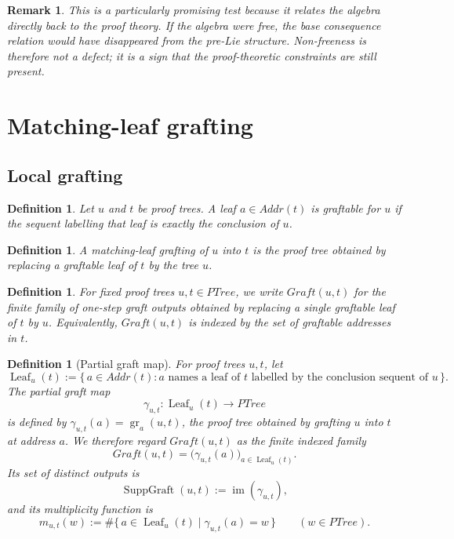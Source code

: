 \documentclass[11pt]{article}
\newtheorem{definition}[theorem]{Definition}
\newtheorem{remark}[theorem]{Remark}
\newcommand{\PTree}{\mathit{PTree}}
\newcommand{\Addr}{\mathit{Addr}}
\newcommand{\Graft}{\mathit{Graft}}
\newcommand{\graftat}[3]{\operatorname{gr}_{#2}(#3,#1)}
\begin{document}
\begin{remark}
This is a particularly promising test because it relates the algebra directly
back to the proof theory.  If the algebra were free, the base consequence
relation would have disappeared from the pre-Lie structure.  Non-freeness is
therefore not a defect; it is a sign that the proof-theoretic constraints are
still present.
\end{remark}

\iffalse
\section{Matching-leaf grafting}

\subsection{Local grafting}

\begin{definition}
Let \(u\) and \(t\) be proof trees. A leaf \(a\in \Addr(t)\) is
\emph{graftable for \(u\)} if the sequent labelling that leaf is exactly the
conclusion of \(u\).
\end{definition}

\begin{definition}
A \emph{matching-leaf grafting} of \(u\) into \(t\) is the proof tree obtained
by replacing a graftable leaf of \(t\) by the tree \(u\).
\end{definition}

\begin{definition}
For fixed proof trees \(u,t\in \PTree\), we write \(\Graft(u,t)\) for the
\emph{finite family of one-step graft outputs} obtained by replacing a single
graftable leaf of \(t\) by \(u\). Equivalently, \(\Graft(u,t)\) is indexed by
the set of graftable addresses in \(t\).
\end{definition}

\begin{definition}[Partial graft map]
For proof trees \(u,t\), let
\[
\operatorname{Leaf}_u(t):=
\{\,a\in \Addr(t): \text{$a$ names a leaf of \(t\) labelled by the
conclusion sequent of \(u\)}\,\}.
\]
The \emph{partial graft map}
\[
\gamma_{u,t}:\operatorname{Leaf}_u(t)\to \PTree
\]
is defined by \(\gamma_{u,t}(a)=\graftat{t}{a}{u}\), the proof tree obtained by
grafting \(u\) into \(t\) at address \(a\). We therefore regard
\(\Graft(u,t)\) as the finite indexed family
\[
\Graft(u,t)=\bigl(\gamma_{u,t}(a)\bigr)_{a\in \operatorname{Leaf}_u(t)}.
\]
Its set of distinct outputs is
\[
\operatorname{SuppGraft}(u,t):=\operatorname{im}(\gamma_{u,t}),
\]
and its multiplicity function is
\[
m_{u,t}(w):=
\#\{\,a\in \operatorname{Leaf}_u(t)\mid \gamma_{u,t}(a)=w\,\}
\qquad (w\in \PTree).
\]
\end{definition}
\end{document}
